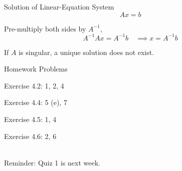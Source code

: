 \documentclass{./../../Latex/teaching_slides}
\begin{document}
\begin{frame}{Solution of Linear-Equation System}
$$ Ax = b $$
\pause

\vspace{1em}
Pre-multiply both sides by $A^{-1}$, 
$$ A^{-1} Ax = A^{-1} b \quad \implies x = A^{-1} b $$

\pause If $A$ is singular, a unique solution does not exist. 
\end{frame}

\begin{frame}{Homework Problems}
  \begin{witemize}
  \normalsize
  \item Exercise 4.2: 1, 2, 4
  \item Exercise 4.4: 5 (e), 7
  \item Exercise 4.5: 1, 4 
  \item Exercise 4.6: 2, 6 \\~\\
\end{witemize}
Reminder: Quiz 1 is next week.
\end{frame}
\end{document}
